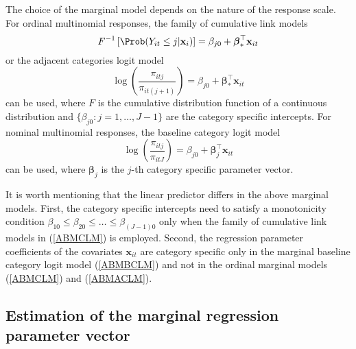 \documentclass[
]{jss}
\begin{document}
The choice of the marginal model depends on the nature of the response
scale. For ordinal multinomial responses, the family of cumulative link
models \begin{equation}
F^{-1}\left[\Prob(Y_{it}\leq j|\mathbf x_i)\right]=\beta_{j0}+ {\boldsymbol \beta}_{\ast}^{\top} \mathbf{x}_{it}
\label{ABMCLM}
\end{equation} or the adjacent categories logit model\\
\begin{equation}
\log\left(\frac{\pi_{itj}}{\pi_{it(j+1)}} \right)=\beta_{j0}+ {\boldsymbol \beta}_{\ast}^{\top} \mathbf{x}_{it}
\label{ABMACLM}
\end{equation} can be used, where \(F\) is the cumulative distribution
function of a continuous distribution and
\(\{\beta_{j0}:j=1,\ldots,J-1\}\) are the category specific intercepts.
For nominal multinomial responses, the baseline category logit model
\begin{equation}
\log\left(\frac{\pi_{itj}}{\pi_{itJ}}\right)=\beta_{j0}+{\boldsymbol {\beta}}_{j}^{\top} \mathbf{x}_{it}
\label{ABMBCLM}
\end{equation} can be used, where \(\boldsymbol {\beta}_{j}\) is the
\(j\)-th category specific parameter vector.

It is worth mentioning that the linear predictor differs in the above
marginal models. First, the category specific intercepts need to satisfy
a monotonicity condition
\(\beta_{10}\leq\beta_{20}\leq \ldots \leq \beta_{(J-1)0}\) only when
the family of cumulative link models in (\ref{ABMCLM}) is employed.
Second, the regression parameter coefficients of the covariates
\(\mathbf x_{it}\) are category specific only in the marginal baseline
category logit model (\ref{ABMBCLM}) and not in the ordinal marginal
models (\ref{ABMCLM}) and (\ref{ABMACLM}).

\hypertarget{estimation-of-the-marginal-regression-parameter-vector}{%
\subsection{Estimation of the marginal regression parameter
vector}\label{estimation-of-the-marginal-regression-parameter-vector}}
\end{document}
